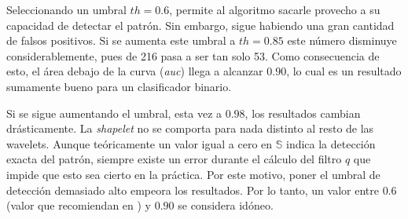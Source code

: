 Seleccionando un umbral $th=0.6$, permite al algoritmo sacarle provecho a su capacidad de detectar el patrón. Sin embargo,
sigue habiendo una gran cantidad de falsos positivos. Si se aumenta este umbral a $th=0.85$ este número
disminuye considerablemente, pues de 216 pasa a ser tan solo 53. Como consecuencia de esto, el área debajo de la curva
(\textit{auc}) llega a alcanzar $0.90$, lo cual es un resultado sumamente bueno para un clasificador binario.

Si se sigue aumentando el umbral, esta vez a $0.98$, los resultados cambian drásticamente. La \textit{shapelet} no
se comporta para nada distinto al resto de las wavelets. Aunque teóricamente un valor igual a cero en $\mathbb{S}$ indica
la detección exacta del patrón, siempre existe un error durante el cálculo del filtro $q$ que impide que esto sea
cierto en la práctica. Por este motivo, poner el umbral de detección demasiado alto empeora los resultados.
Por lo tanto, un valor entre $0.6$ (valor que recomiendan en \cite{Guido2018}) y $0.90$ se considera idóneo.


